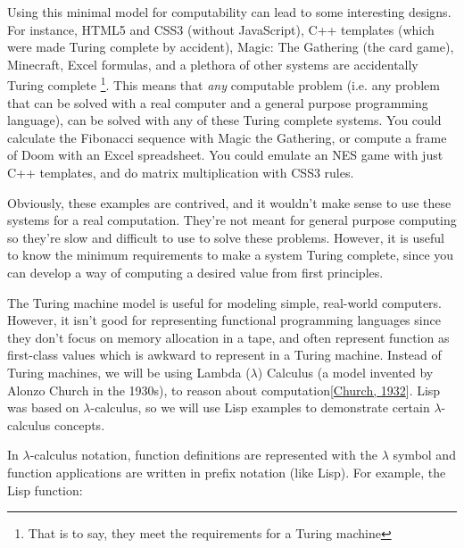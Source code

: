 \documentclass{book}
\newcommand{\NoteBox}[1]{\footnote{#1}}
\newcommand{\NoteContent}[1]{#1}
\begin{document}
Using this minimal model for computability can lead to some interesting
designs. For instance, HTML5 and CSS3 (without JavaScript),
C++ templates (which were made Turing complete by accident), Magic: The
Gathering (the card game), Minecraft, Excel formulas, and a plethora of
other systems are accidentally Turing complete \NoteBox{\NoteContent{That is to say, they
meet the requirements for a Turing machine}}. This means that \textit{any}
computable problem
(i.e. any problem that can be solved with a real computer and a general
      purpose programming language), can be solved with any of these
Turing complete systems. You could calculate the Fibonacci sequence with
Magic the Gathering, or compute a frame of Doom with an Excel spreadsheet.
You could emulate an NES game with just C++ templates, and do matrix
multiplication with CSS3 rules.

Obviously, these examples are contrived, and it wouldn{'}t make sense to use
these systems for a real computation. They{'}re not meant for
general purpose computing so they{'}re slow and difficult to use to solve
these problems. However, it is useful to know the minimum requirements to
make a system Turing complete, since you can develop a way of computing
a desired value from first principles.

The Turing machine model is useful for modeling simple, real{-}world
computers. However, it isn{'}t good for representing functional programming
languages since they don{'}t focus on memory allocation in a tape, and often
represent function as first{-}class values which is awkward to represent in
a Turing machine. Instead of Turing machines, we will be using Lambda ($\lambda$)
Calculus (a model invented by Alonzo Church in the 1930s), to reason about
computation[\hyperref[t:x28cite_x22Churchx2c_1932x22x29]{Church, 1932}]. Lisp was based on $\lambda${-}calculus, so we will
use Lisp examples to demonstrate certain $\lambda${-}calculus concepts.

In $\lambda${-}calculus notation, function definitions are represented with the
$\lambda$ symbol and function applications are written in prefix notation (like
Lisp). For example, the Lisp function:
\end{document}
